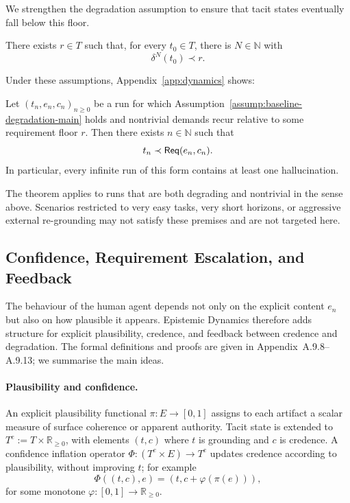 We strengthen the degradation assumption to ensure that tacit states
eventually fall below this floor.

\begin{assumption}
\label{assump:baseline-degradation-main}
There exists \(r\in T\) such that, for every \(t_0\in T\), there is
\(N\in\mathbb{N}\) with
\[
\delta^N(t_0) \prec r.
\]
\end{assumption}

Under these assumptions, Appendix~\ref{app:dynamics} shows:

\begin{theorem}
\label{thm:baseline-inevitability-main}
Let \((t_n,e_n,c_n)_{n\ge 0}\) be a run for which
Assumption~\ref{assump:baseline-degradation-main} holds and
nontrivial demands recur relative to some requirement floor \(r\). Then
there exists \(n\in\mathbb{N}\) such that
\[
t_n \prec \mathsf{Req}(e_n,c_n).
\]
In particular, every infinite run of this form contains at least one
hallucination.
\end{theorem}

The theorem applies to runs that are both degrading and nontrivial in
the sense above. Scenarios restricted to very easy tasks, very short
horizons, or aggressive external re-grounding may not satisfy these
premises and are not targeted here.

\subsection{Confidence, Requirement Escalation, and Feedback}

The behaviour of the human agent depends not only on the explicit
content \(e_n\) but also on how plausible it appears. Epistemic Dynamics therefore
adds structure for explicit plausibility, credence, and feedback between
credence and degradation. The formal definitions and proofs are given in
Appendix~A.9.8–A.9.13; we summarise the main ideas.

\paragraph{Plausibility and confidence.}
An explicit plausibility functional \(\pi:E\to[0,1]\) assigns to each
artifact a scalar measure of surface coherence or apparent authority.
Tacit state is extended to \(T^e:=T\times\mathbb{R}_{\ge 0}\), with
elements \((t,c)\) where \(t\) is grounding and \(c\) is credence. A
confidence inflation operator
\(\Phi:(T^e\times E)\to T^e\) updates credence according to plausibility,
without improving \(t\); for example
\[
\Phi((t,c),e) = (t,c+\varphi(\pi(e))),
\]
for some monotone \(\varphi:[0,1]\to\mathbb{R}_{\ge 0}\).

